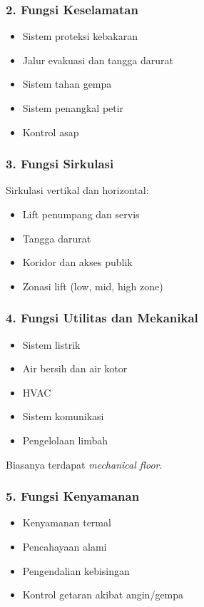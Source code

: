 \documentclass[../skb.tex]{subfiles}
\begin{document}
\begin{frame}[t,mycolor=digiPH_leaf,mytitle=standard,dark]
	\frametitle{2. Fungsi Keselamatan}

	\begin{itemize}
		\item Sistem proteksi kebakaran
		\item Jalur evakuasi dan tangga darurat
		\item Sistem tahan gempa
		\item Sistem penangkal petir
		\item Kontrol asap
	\end{itemize}

\end{frame}

\begin{frame}[t,mycolor=digiPH_leaf,mytitle=standard,dark]
	\frametitle{3. Fungsi Sirkulasi}

	Sirkulasi vertikal dan horizontal:

	\begin{itemize}
		\item Lift penumpang dan servis
		\item Tangga darurat
		\item Koridor dan akses publik
		\item Zonasi lift (low, mid, high zone)
	\end{itemize}

\end{frame}

\begin{frame}[t,mycolor=digiPH_leaf,mytitle=standard,dark]
	\frametitle{4. Fungsi Utilitas dan Mekanikal}

	\begin{itemize}
		\item Sistem listrik
		\item Air bersih dan air kotor
		\item HVAC
		\item Sistem komunikasi
		\item Pengelolaan limbah
	\end{itemize}

	Biasanya terdapat \textit{mechanical floor}.

\end{frame}

\begin{frame}[t,mycolor=digiPH_leaf,mytitle=standard,dark]
	\frametitle{5. Fungsi Kenyamanan}

	\begin{itemize}
		\item Kenyamanan termal
		\item Pencahayaan alami
		\item Pengendalian kebisingan
		\item Kontrol getaran akibat angin/gempa
	\end{itemize}

\end{frame}
\end{document}
